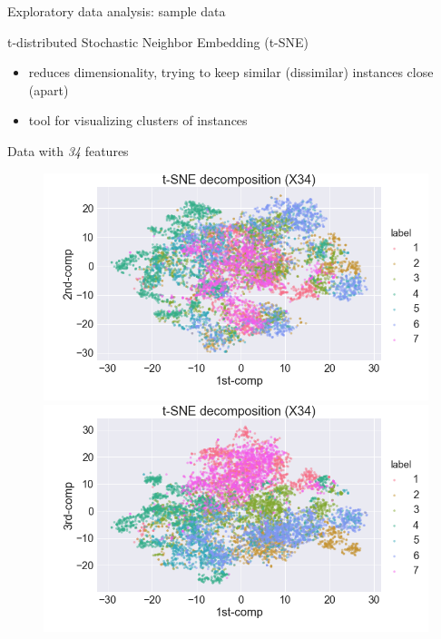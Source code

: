 \documentclass{if-beamer}
\begin{document}
 
\begin{frame}{Exploratory data analysis: sample data}
        \begin{block}{t-distributed Stochastic Neighbor Embedding (t-SNE)}    
        \begin{itemize}
                \item reduces dimensionality, trying to keep similar (dissimilar) instances close  (apart)
                \item tool for visualizing clusters of instances 
        \end{itemize}                 

         \begin{exampleblock}{Data with \emph{34} features}
            	 \begin{figure}
                    \includegraphics[scale=0.2]{./figs/tSNE12.png}
                    \includegraphics[scale=0.2]{./figs/tSNE13.png}
                    \end{figure} 
               \end{exampleblock}

   	 \end{block}
	
\end{frame}
\end{document}
